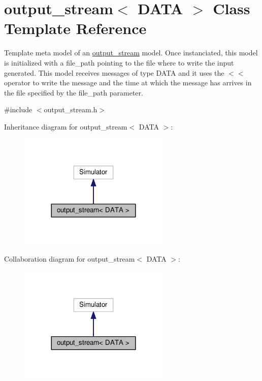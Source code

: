 \hypertarget{classoutput__stream}{}\section{output\+\_\+stream$<$ D\+A\+TA $>$ Class Template Reference}
\label{classoutput__stream}


Template meta model of an \hyperlink{classoutput__stream}{output\+\_\+stream} model. Once instanciated, this model is initialized with a file\+\_\+path pointing to the file where to write the input generated. This model receives messages of type D\+A\+TA and it uses the $<$$<$ operator to write the message and the time at which the message has arrives in the file specified by the file\+\_\+path parameter.  




{\ttfamily \#include $<$output\+\_\+stream.\+h$>$}



Inheritance diagram for output\+\_\+stream$<$ D\+A\+TA $>$\+:\nopagebreak
\begin{figure}[H]
\begin{center}
\leavevmode
\includegraphics[width=204pt]{classoutput__stream__inherit__graph}
\end{center}
\end{figure}


Collaboration diagram for output\+\_\+stream$<$ D\+A\+TA $>$\+:\nopagebreak
\begin{figure}[H]
\begin{center}
\leavevmode
\includegraphics[width=204pt]{classoutput__stream__coll__graph}
\end{center}
\end{figure}
